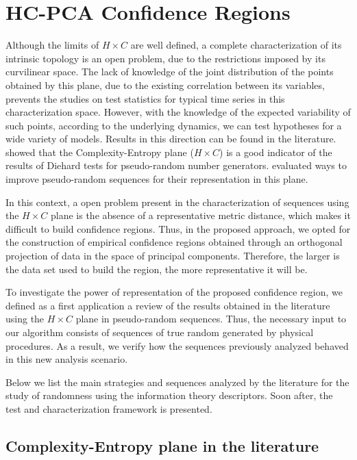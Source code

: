 \chapter{HC-PCA Confidence Regions}\label{chapter:HCPCA}

Although the limits of $H \times C$ are well defined, a complete characterization of its intrinsic topology is an open problem, due to the restrictions imposed by its curvilinear space.
The lack of knowledge of the joint distribution of the points obtained by this plane, due to the existing correlation between its variables, prevents the studies on test statistics for typical time series in this characterization space.
However, with the knowledge of the expected variability of such points, according to the underlying dynamics, we can test hypotheses for a wide variety of models.
Results in this direction can be found in the literature.
\cite{RandomNumberGeneratorsCausality} showed that the Complexity-Entropy plane ($ H \times C $) is a good indicator of the results of Diehard tests for pseudo-random number generators.
\cite{De_Micco_2008} evaluated ways to improve pseudo-random sequences for their representation in this plane.

In this context, a open problem present in the characterization of sequences using the $H \times C$ plane is the absence of a representative metric distance, which makes it difficult to build confidence regions.
Thus, in the proposed approach, we opted for the construction of empirical confidence regions obtained through an orthogonal projection of data in the space of principal components.
Therefore, the larger is the data set used to build the region, the more representative it will be.

To investigate the power of representation of the proposed confidence region, we defined as a first application a review of the results obtained in the literature using the $H \times C$ plane in pseudo-random sequences.
Thus, the necessary input to our algorithm consists of sequences of true random generated by physical procedures.
As a result, we verify how the sequences previously analyzed behaved in this new analysis scenario.

Below we list the main strategies and sequences analyzed by the literature for the study of randomness using the information theory descriptors.
Soon after, the test and characterization framework is presented.

\section{Complexity-Entropy plane in the literature}

